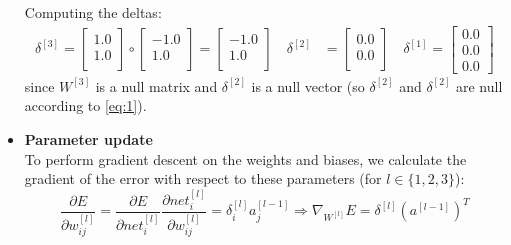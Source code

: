 \documentclass{exam}
\begin{document}
\begin{questions}
\begin{itemize}
\begin{equation}
                \label{eq:2}
            \end{equation}
            Computing the deltas:
            \vspace{-0.68em}
            \begin{align*}
                \delta^{[3]} = 
                \begin{bmatrix}
                    1.0  \\
                    1.0 \\
                \end{bmatrix} \circ
                \begin{bmatrix}
                    -1.0  \\
                    1.0  \\
                \end{bmatrix} = 
                \begin{bmatrix}
                    -1.0  \\
                    1.0  \\
                \end{bmatrix} \quad
                \delta^{[2]} &= 
                \begin{bmatrix}
                    0.0  \\
                    0.0  \\
                \end{bmatrix} \quad
                \delta^{[1]} = 
                \begin{bmatrix}
                    0.0  \\
                    0.0  \\
                    0.0
                \end{bmatrix}
            \end{align*} 
            since $W^{[3]}$ is a null matrix and $\delta^{[2]}$ is a null vector (so $\delta^{[2]}$ and $\delta^{[2]}$ are null according to \eqref{eq:1}). \medskip
            \item \textbf{Parameter update} \\[0.4em]
            To perform gradient descent on the weights and biases, we calculate the gradient of the error with respect to these parameters (for $l \in \{1, 2, 3\}$):
            \begin{equation}
                \frac{\partial E}{\partial w_{ij}^{[l]}} = \frac{\partial E}{\partial net_{i}^{[l]}} \frac{\partial net_i^{[l]}}{\partial w_{ij}^{[l]}} = \delta_i^{[l]} a_j^{[l - 1]} \Rightarrow \nabla_{W^{[l]}} E = \delta^{[l]} (a^{[l - 1]})^{T} \label{eq:3}

\end{equation}
\end{itemize}
\end{questions}
\end{document}
